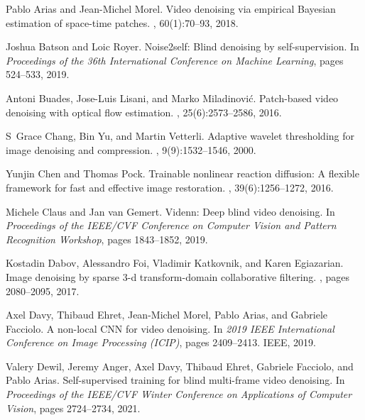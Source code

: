 \documentclass[final]{cvpr}
\begin{document}
{\small
\begin{thebibliography}{10}\itemsep=-1pt

Pablo Arias and Jean-Michel Morel.
\newblock Video denoising via empirical {Bayesian} estimation of space-time
  patches.
, 60(1):70--93, 2018.

Joshua Batson and Loic Royer.
\newblock Noise2self: Blind denoising by self-supervision.
\newblock In {\em Proceedings of the 36th International Conference on Machine
  Learning}, pages 524--533, 2019.

Antoni Buades, Jose-Luis Lisani, and Marko Miladinovi{\'c}.
\newblock Patch-based video denoising with optical flow estimation.
, 25(6):2573--2586, 2016.

S~Grace Chang, Bin Yu, and Martin Vetterli.
\newblock Adaptive wavelet thresholding for image denoising and compression.
, 9(9):1532--1546, 2000.

Yunjin Chen and Thomas Pock.
\newblock Trainable nonlinear reaction diffusion: A flexible framework for fast
  and effective image restoration.
,
  39(6):1256--1272, 2016.

Michele Claus and Jan van Gemert.
\newblock Videnn: Deep blind video denoising.
\newblock In {\em Proceedings of the IEEE/CVF Conference on Computer Vision and
  Pattern Recognition Workshop}, pages 1843--1852, 2019.

Kostadin Dabov, Alessandro Foi, Vladimir Katkovnik, and Karen Egiazarian.
\newblock Image denoising by sparse 3-d transform-domain collaborative
  filtering.
, pages 2080--2095, 2017.

Axel Davy, Thibaud Ehret, Jean-Michel Morel, Pablo Arias, and Gabriele
  Facciolo.
\newblock A non-local {CNN} for video denoising.
\newblock In {\em 2019 IEEE International Conference on Image Processing
  (ICIP)}, pages 2409--2413. IEEE, 2019.

Valery Dewil, Jeremy Anger, Axel Davy, Thibaud Ehret, Gabriele Facciolo, and
  Pablo Arias.
\newblock Self-supervised training for blind multi-frame video denoising.
\newblock In {\em Proceedings of the IEEE/CVF Winter Conference on Applications
  of Computer Vision}, pages 2724--2734, 2021.


\end{thebibliography}}
\end{document}
